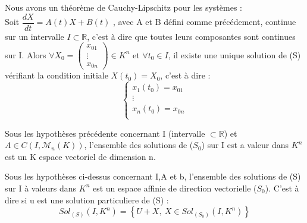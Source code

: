\begin{theo}
Nous avons un théorème de Cauchy-Lipschitz pour les systèmes :\\
Soit $\dfrac{dX}{dt} = A(t)X + B(t)$
, avec A et B défini comme précédement, continue sur un intervalle $I \subset \mathbb{R}$, c'est à dire que toutes leurs composantes sont continues sur I. Alors $\forall X_0 = \begin{pmatrix}
                                                                                                                                                                                x_{01} \\
						     \vdots \\
						     x_{0n}
\end{pmatrix} \in K^n$ et $\forall t_0 \in I$, il existe une unique solution de (S) vérifiant la condition initiale $X(t_0)=X_0$, c'est à dire : 
$$\begin{cases}
   x_1(t_0)=x_{01} \\
   \vdots \\
   x_n(t_0)=x_{0n} \\
  \end{cases}
$$ 
\end{theo}
\begin{coro}
Sous les hypothèses précédente concernant I (intervalle $\subset \mathbb{R}$) et $A \in C(I,\mathcal{M}_n(K))$, l'ensemble des solutions de ($S_0$) sur I est a valeur dans $K^n$ est un K espace vectoriel de dimension n. 
\end{coro}
\begin{coro}
Sous les hypothèses ci-dessus concernant I,A et b, l'ensemble des solutions de (S) sur I à valeurs dans $K^n$ est un espace affinie de direction vectorielle ($S_0$). C'est à dire si u est une solution particuliere de (S) : 
$$Sol_{(S)}(I,K^n)= \left\lbrace U + X,~ X \in Sol_{(S_0)}(I,K^n)\right\rbrace  $$
\end{coro}

